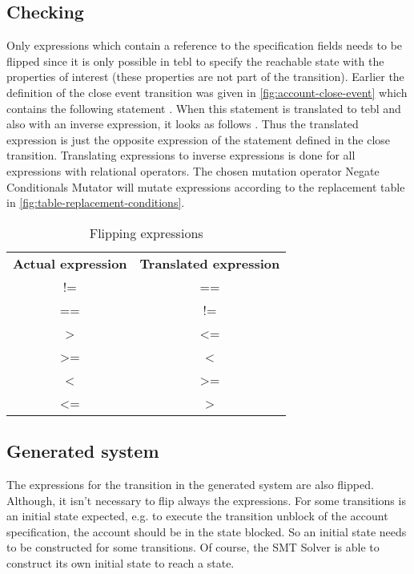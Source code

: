\subsection{Checking}
Only expressions which contain a reference to the specification fields needs to be flipped since it is only possible in tebl to specify the reachable state with the properties of interest (these properties are not part of the transition). Earlier the definition of the close event transition was given in \autoref{fig:account-close-event} which contains the following statement . When this statement is translated to tebl and also with an inverse expression, it looks as follows . Thus the translated expression is just the opposite expression of the statement defined in the close transition. Translating expressions to inverse expressions is done for all expressions with relational operators. The chosen mutation operator Negate Conditionals Mutator will mutate expressions according to the replacement table in \autoref{fig:table-replacement-conditions}.

\begin{table}[]
\centering
\begin{tabular}{cc}
\textbf{Actual expression} & \textbf{Translated expression} \\
!=                         & ==                             \\
==                         & !=                             \\
\textgreater               & \textless=                     \\
\textgreater=              & \textless                      \\
\textless                  & \textgreater=                  \\
\textless=                 & \textgreater                   \\
\end{tabular}
\caption{Flipping expressions}
\label{fig:table-replacement-conditions}
\end{table}

\subsection{Generated system} 
The expressions for the transition in the generated system are also flipped. Although, it isn't necessary to flip always the expressions. For some transitions is an initial state expected, e.g. to execute the transition unblock of the account specification, the account should be in the state blocked. So an initial state needs to be constructed for some transitions. Of course, the SMT Solver is able to construct its own initial state to reach a state. 


